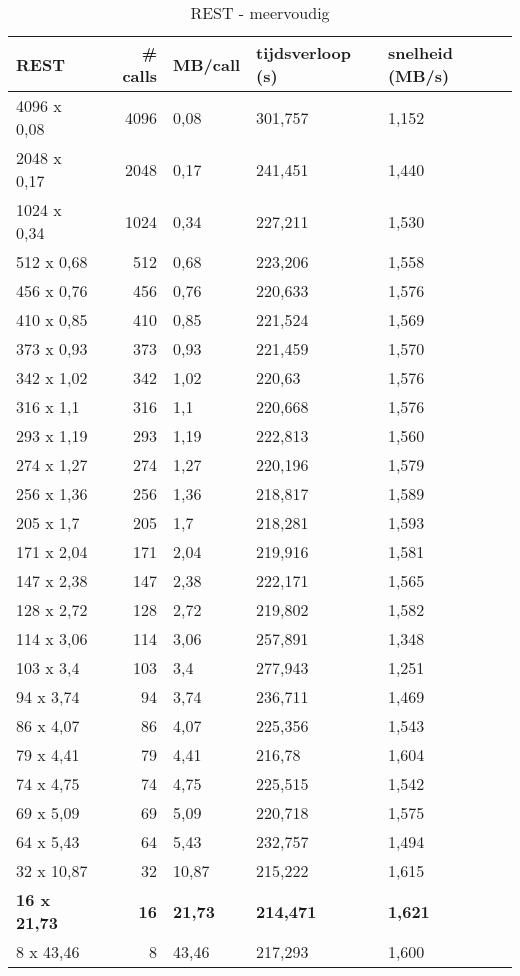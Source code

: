 \begin{table}
    \centering
    \begin{tabular}{lrlll}
        \toprule
        \textbf{REST} & \textbf{\# calls} & \textbf{MB/call} & \textbf{tijdsverloop (s)} & \textbf{snelheid (MB/s)} \\
        \midrule
        4096 x 0,08 & 4096 & 0,08 & 301,757 & 1,152 \\
        2048 x 0,17 & 2048 & 0,17 & 241,451 & 1,440 \\
        1024 x 0,34 & 1024 & 0,34 & 227,211 & 1,530 \\
        512 x 0,68 & 512 & 0,68 & 223,206 & 1,558 \\
        456 x 0,76 & 456 & 0,76 & 220,633 & 1,576 \\
        410 x 0,85 & 410 & 0,85 & 221,524 & 1,569 \\
        373 x 0,93 & 373 & 0,93 & 221,459 & 1,570 \\
        342 x 1,02 & 342 & 1,02 & 220,63 & 1,576 \\
        316 x 1,1 & 316 & 1,1 & 220,668 & 1,576 \\
        293 x 1,19 & 293 & 1,19 & 222,813 & 1,560 \\
        274 x 1,27 & 274 & 1,27 & 220,196 & 1,579 \\
        256 x 1,36 & 256 & 1,36 & 218,817 & 1,589 \\
        205 x 1,7 & 205 & 1,7 & 218,281 & 1,593 \\
        171 x 2,04 & 171 & 2,04 & 219,916 & 1,581 \\
        147 x 2,38 & 147 & 2,38 & 222,171 & 1,565 \\
        128 x 2,72 & 128 & 2,72 & 219,802 & 1,582 \\
        114 x 3,06 & 114 & 3,06 & 257,891 & 1,348 \\
        103 x 3,4 & 103 & 3,4 & 277,943 & 1,251 \\
        94 x 3,74 & 94 & 3,74 & 236,711 & 1,469 \\
        86 x 4,07 & 86 & 4,07 & 225,356 & 1,543 \\
        79 x 4,41 & 79 & 4,41 & 216,78 & 1,604 \\
        74 x 4,75 & 74 & 4,75 & 225,515 & 1,542 \\
        69 x 5,09 & 69 & 5,09 & 220,718 & 1,575 \\
        64 x 5,43 & 64 & 5,43 & 232,757 & 1,494 \\
        32 x 10,87 & 32 & 10,87 & 215,222 & 1,615 \\
        \textbf{16 x 21,73} & \textbf{16} & \textbf{21,73} & \textbf{214,471} & \textbf{1,621} \\
        8 x 43,46 & 8 & 43,46 & 217,293 & 1,600 \\
        \bottomrule
    \end{tabular}
    \caption{REST - meervoudig}
    \label{tab:RESTmeervoudig}
\end{table}

